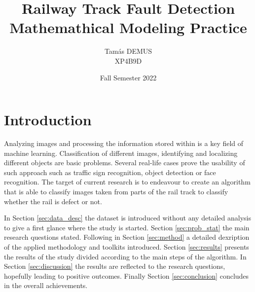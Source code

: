 \documentclass[10pt, final]{article}
\title{Railway Track Fault Detection\\\large Mathemathical Modeling Practice\\}
\author{Tamás DEMUS\\XP4B9D}
\date{Fall Semester 2022}
\begin{document}
	\maketitle
	\tableofcontents
	\section{Introduction}
		Analyzing images and processing the information stored within 
		is a key field of machine learning.
		Classification of different images, identifying and localizing 
		different objects are basic problems.
		Several real-life cases prove the usability of such approach 
		such as traffic sign recognition, object detection or face recognition.
		The target of current research is to endeavour to create an algorithm
		that is able to classify images taken from parts of the rail track
		to classify whether the rail is defect or not.

		In Section \ref{sec:data_desc} the dataset is introduced without any detailed analysis
		to give a first glance where the study is started. 
		Section \ref{sec:prob_stat} the main research questions stated. 
		Following in Section \ref{sec:method} a detailed dexription of the applied methodology
		and toolkits introduced.
		Section \ref{sec:results} presents the results of the study divided according to 
		the main steps of the algorithm.
		In Section \ref{sec:discussion} the results are reflected to the research questions, 
		hopefully leading to positive outcomes.
		Finally Section \ref{sec:conclusion} concludes in the overall achievements.
\end{document}
